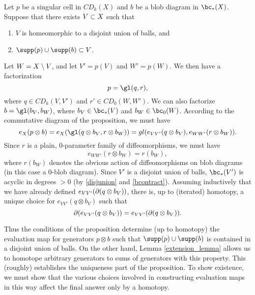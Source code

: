 Let $p$ be a singular cell in $CD_k(X)$ and $b$ be a blob diagram in $\bc_*(X)$.
Suppose that there exists $V \subset X$ such that
\begin{enumerate}
\item $V$ is homeomorphic to a disjoint union of balls, and
\item $\supp(p) \cup \supp(b) \sub V$.
\end{enumerate}
Let $W = X \setminus V$, and let $V' = p(V)$ and $W' = p(W)$.
We then have a factorization 
\[
	p = \gl(q, r),
\]
where $q \in CD_k(V, V')$ and $r' \in CD_0(W, W')$.
We can also factorize $b = \gl(b_V, b_W)$, where $b_V\in \bc_*(V)$ and $b_W\in\bc_0(W)$.
According to the commutative diagram of the proposition, we must have
\[
	e_X(p\otimes b) = e_X(\gl(q\otimes b_V, r\otimes b_W)) = 
				gl(e_{VV'}(q\otimes b_V), e_{WW'}(r\otimes b_W)) .
\]
Since $r$ is a plain, 0-parameter family of diffeomorphisms, we must have
\[
	e_{WW'}(r\otimes b_W) = r(b_W),
\]
where $r(b_W)$ denotes the obvious action of diffeomorphisms on blob diagrams (in
this case a 0-blob diagram).
Since $V'$ is a disjoint union of balls, $\bc_*(V')$ is acyclic in degrees $>0$ 
(by \ref{disjunion} and \ref{bcontract}).
Assuming inductively that we have already defined $e_{VV'}(\partial(q\otimes b_V))$,
there is, up to (iterated) homotopy, a unique choice for $e_{VV'}(q\otimes b_V)$
such that 
\[
	\partial(e_{VV'}(q\otimes b_V)) = e_{VV'}(\partial(q\otimes b_V)) .
\]

Thus the conditions of the proposition determine (up to homotopy) the evaluation
map for generators $p\otimes b$ such that $\supp(p) \cup \supp(b)$ is contained in a disjoint
union of balls.
On the other hand, Lemma \ref{extension_lemma} allows us to homotope 
 arbitrary generators to sums of generators with this property.
This (roughly) establishes the uniqueness part of the proposition.
To show existence, we must show that the various choices involved in constructing
evaluation maps in this way affect the final answer only by a homotopy.



